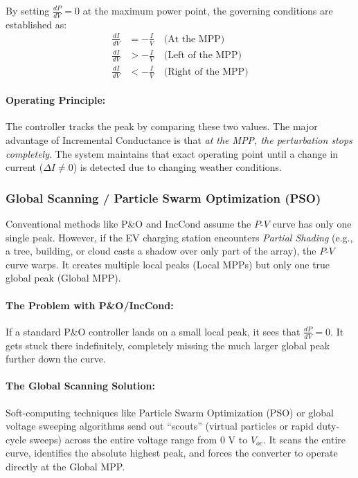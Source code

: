 By setting $\frac{dP}{dV} = 0$ at the maximum power point, the governing conditions are established as:
\begin{align}
    \frac{dI}{dV} &= -\frac{I}{V} \quad \text{(At the MPP)} \\
    \frac{dI}{dV} &> -\frac{I}{V} \quad \text{(Left of the MPP)} \\
    \frac{dI}{dV} &< -\frac{I}{V} \quad \text{(Right of the MPP)}
\end{align}

\paragraph{Operating Principle:}
The controller tracks the peak by comparing these two values. The major advantage of Incremental Conductance is that \textit{at the MPP, the perturbation stops completely}. The system maintains that exact operating point until a change in current ($\Delta I \neq 0$) is detected due to changing weather conditions.

\subsubsection{Global Scanning / Particle Swarm Optimization (PSO)}
Conventional methods like P\&O and IncCond assume the $P$-$V$ curve has only one single peak. However, if the EV charging station encounters \textit{Partial Shading} (e.g., a tree, building, or cloud casts a shadow over only part of the array), the $P$-$V$ curve warps. It creates multiple local peaks (Local MPPs) but only one true global peak (Global MPP).

\paragraph{The Problem with P\&O/IncCond:}
If a standard P\&O controller lands on a small local peak, it sees that $\frac{dP}{dV} = 0$. It gets stuck there indefinitely, completely missing the much larger global peak further down the curve.

\paragraph{The Global Scanning Solution:}
Soft-computing techniques like Particle Swarm Optimization (PSO) or global voltage sweeping algorithms send out ``scouts'' (virtual particles or rapid duty-cycle sweeps) across the entire voltage range from $0\text{ V}$ to $V_{oc}$. It scans the entire curve, identifies the absolute highest peak, and forces the converter to operate directly at the Global MPP.


